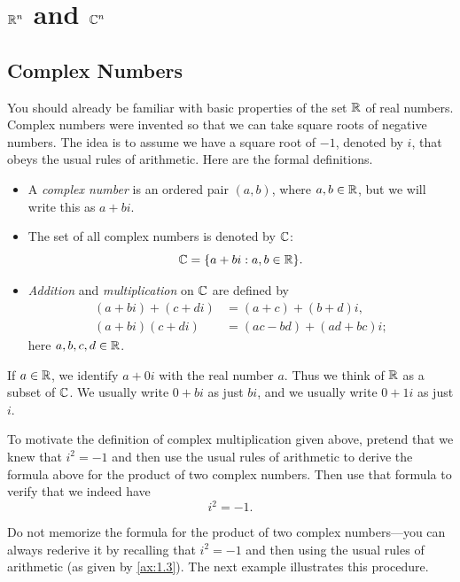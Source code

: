 \section{\texorpdfstring{$\mathbb{R}^n$ and $\mathbb{C}^n$}{R^n and C^n}}

\subsection{Complex Numbers}

You should already be familiar with basic properties of the set $\mathbb{R}$ of real
numbers. Complex numbers were invented so that we can take square roots of
negative numbers. The idea is to assume we have a square root of $-1$, denoted
by $i$, that obeys the usual rules of arithmetic. Here are the formal
definitions.

\begin{definition}\label{ax:1.1}\leavevmode
\begin{itemize}
\item A \emph{complex number} is an ordered pair $(a,b)$, where
  $a,b\in\mathbb{R}$, but we will write this as $a+bi$.
\item The set of all complex numbers is denoted by $\mathbb{C}$:
  \[ \mathbb{C} = \{a+bi : a,b\in\mathbb{R}\}. \]
\item \emph{Addition} and \emph{multiplication} on $\mathbb{C}$ are defined by
  \begin{align*}
    (a+bi)+(c+di) &= (a+c)+(b+d)i,\\
    (a+bi)(c+di)  &= (ac-bd)+(ad+bc)i;
  \end{align*}
  here $a,b,c,d\in\mathbb{R}$.
\end{itemize}
\end{definition}

If $a\in\mathbb{R}$, we identify $a+0i$ with the real number $a$. Thus we think of
$\mathbb{R}$ as a subset of $\mathbb{C}$. We usually write $0+bi$ as just $bi$, and we usually
write $0+1i$ as just $i$.

%
To motivate the definition of complex multiplication given above, pretend that
we knew that $i^2=-1$ and then use the usual rules of arithmetic to derive the
formula above for the product of two complex numbers. Then use that formula to
verify that we indeed have
\[ i^2 = -1. \]

Do not memorize the formula for the product of two complex numbers---you can
always rederive it by recalling that $i^2=-1$ and then using the usual rules of
arithmetic (as given by \ref{ax:1.3}). The next example illustrates this
procedure.

